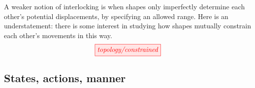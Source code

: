 \begin{myboxB}
\begin{defn}\label{defn:constrained}
A weaker notion of interlocking is when shapes only imperfectly determine each other's potential displacements, by specifying an allowed range. Here is an understatement: there is some interest in studying how shapes mutually constrain each other's movements in this way.
\[\tikzfig{topology/constrained}\]
\end{defn}
\end{myboxB}

\clearpage
\newpage

\subsection{States, actions, manner}\label{sec:statesactions}

